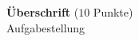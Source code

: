\documentclass[11pt,a4paper]{article}
\date     {\today}
\begin{document}
%
\makeheader
\begin{exercises}
\item {\bf Überschrift}  \hfill ($10$ Punkte) \\
Aufgabestellung


\end{exercises}
\end{document}
